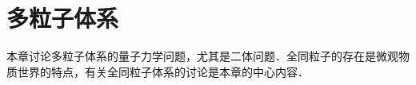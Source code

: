 \chapter{多粒子体系}\label{chp:10}

本章讨论多粒子体系的量子力学问题，尤其是二体问题．全同粒子的存在是微观物质世界的特点，有关全同粒子体系的讨论是本章的中心内容．














